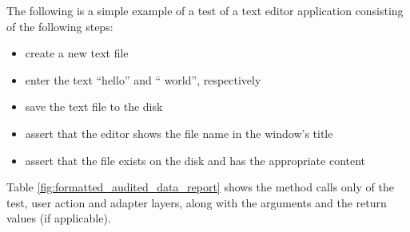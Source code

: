 The following is a simple example of a test of a text editor application consisting of the following steps:
\begin{itemize}
\item create a new text file
\item enter the text ``hello'' and `` world'', respectively
\item save the text file to the disk
\item assert that the editor shows the file name in the window's title
\item assert that the file exists on the disk and has the appropriate content
\end{itemize}

Table \ref{fig:formatted_audited_data_report} shows the method calls only of the test, user action and adapter layers, along with the arguments and the return values (if applicable).

